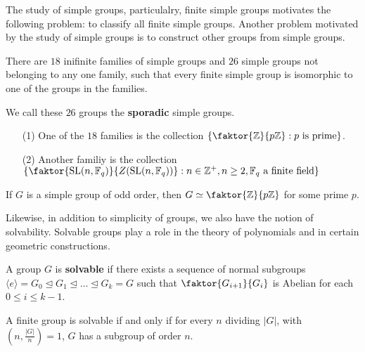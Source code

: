 The study of simple groups, particulalry, finite simple groups motivates the
following problem: to classify all finite simple groups. Another problem
motivated by the study of simple groups is to construct other groups from simple
groups.

\begin{theorem}\label{theorem_3.5.3}
  There are $18$ inifinite families of simple groups and $26$ simple groups
  not belonging to any one family, such that every finite simple group is
  isomorphic to one of the groups in the families.
\end{theorem}
\begin{remark}
  We call these $26$ groups the \textbf{sporadic} simple groups.
\end{remark}

\begin{example}\label{example_3.10}
  \begin{enumerate}
    \item[(1)] One of the $18$ families is the collection
      $\{\faktor{\Z}{p\Z} : p \text{ is prime}\}$.

    \item[(2)] Another familiy is the collection
      $\{\faktor{\SL(n,\F_q)}{Z(\SL(n, \F_q))} : n \in \Z^+, n \geq 2,\F_q \text{
      a finite field} \}$
  \end{enumerate}
\end{example}

\begin{theorem}\label{theorem_3.5.4}
  If $G$ is a simple group of odd order, then $G \simeq \faktor{\Z}{p\Z}$ for
  some prime $p$.
\end{theorem}

Likewise, in addition to simplicity of groups, we also have the notion of
solvability. Solvable groups play a role in the theory of polynomials and in
certain geometric constructions.

\begin{definition}
  A group $G$ is \textbf{solvable} if there exists a sequence of normal
  subgroups $\langle e \rangle=G_0 \unlhd G_1 \unlhd \dots \unlhd G_k=G$ such that
  $\faktor{G_{i+1}}{G_i}$ is Abelian for each $0 \leq i \leq k-1$.
\end{definition}

\begin{theorem}\label{theorem_3.5.5}
  A finite group is solvable if and only if for every $n$ dividing
  $|G|$, with $(n,\frac{|G|}{n})=1$, $G$ has a subgroup of order $n$.
\end{theorem}

